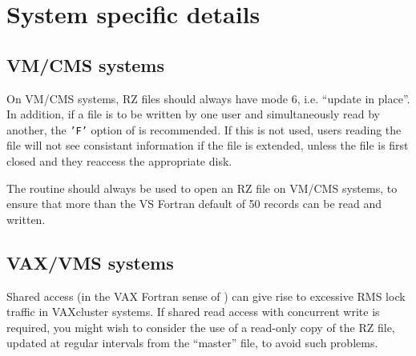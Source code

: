 
\chapter{System specific details}

\section{VM/CMS systems}

On VM/CMS systems, RZ files should always have mode 6, i.e. ``update
in place''. In addition, if a file is to be written by one user
and simultaneously read by another, the {\tt'F'} option of  is 
recommended. If this is not used, users reading the file will
not see consistant information if the file is extended, unless
the file is first closed and they reaccess the appropriate disk.
\par
The  routine should always be used to open an RZ file
on VM/CMS systems, to ensure that more than the VS Fortran default
of 50 records can be read and written.

\section{VAX/VMS systems}

Shared access (in the VAX Fortran sense of )
can give rise to excessive RMS lock traffic in VAXcluster systems.
If shared read access with concurrent write is required, you
might wish to consider the use of a read-only copy of the
RZ file, updated at regular intervals from the ``master'' file,
to avoid such problems.

